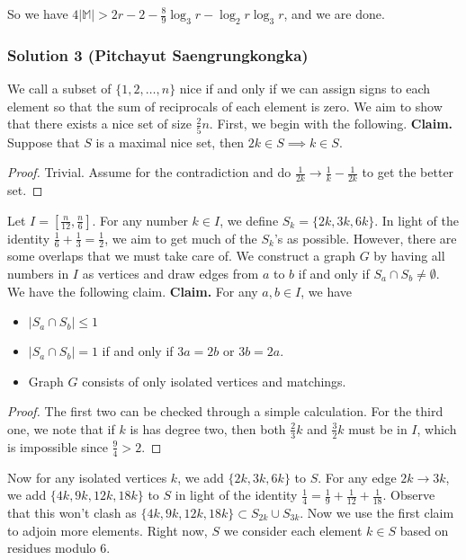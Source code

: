 So we have $4|\mathbb{M}| > 2r - 2 - \frac{8}{9}\log_3 r - \log_2 r \log_3 r$, and we are done.

\subsubsection{Solution 3 (Pitchayut Saengrungkongka)}
We call a subset of $\{1,2,\hdots,n\}$ nice if and only if we can assign signs to each element so that the sum of reciprocals of each element is zero. We aim to show that there exists a nice set of size $\tfrac{2}{5}n$. First, we begin with the following.
\nl
\textbf{Claim.}
Suppose that $S$ is a maximal nice set, then $2k\in S\implies k\in S$.
\nl
\begin{proof}
    Trivial. Assume for the contradiction and do $\tfrac{1}{2k}\to\tfrac 1k - \tfrac{1}{2k}$ to get the better set.
\end{proof}
Let $I =\left[\tfrac{n}{12}, \tfrac n6\right]$. For any number $k\in I$, we define $S_k=\{2k,3k,6k\}$. In light of the identity $\tfrac 16 + \tfrac 13 = \tfrac 12$, we aim to get much of the $S_k$'s as possible. However, there are some overlaps that we must take care of.
\nl We construct a graph $G$ by having all numbers in $I$ as vertices and draw edges from $a$ to $b$ if and only if $S_a\cap S_b\ne\emptyset$.  We have the following claim.
\nl
\textbf{Claim.} For any $a,b\in I$, we have
\begin{itemize}
    \item $|S_a\cap S_b| \leq 1$
    \item $|S_a\cap S_b| = 1$ if and only if $3a=2b$ or $3b=2a$.
    \item Graph $G$ consists of only isolated vertices and matchings.
\end{itemize}
\begin{proof}
    The first two can be checked through a simple calculation. For the third one, we note that if $k$ is has degree two, then both $\tfrac 23 k$ and $\tfrac 32 k$ must be in $I$, which is impossible since $\tfrac 94 > 2$.
\end{proof} Now for any isolated vertices $k$, we add $\{2k,3k,6k\}$ to $S$. For any edge $2k\to 3k$, we add $\{4k, 9k, 12k, 18k\}$ to $S$ in light of the identity $\tfrac 14 = \tfrac 19 + \tfrac{1}{12} + \tfrac{1}{18}$. Observe that this won't clash as $\{4k,9k,12k,18k\}\subset S_{2k}\cup S_{3k}$.
\nl Now we use the first claim to adjoin more elements. Right now, $S$ we consider each element $k\in S$ based on residues modulo $6$.
